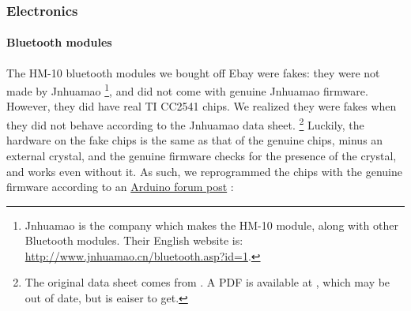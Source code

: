\documentclass[]{article}
\let\oldparagraph\paragraph
\renewcommand{\paragraph}[1]{\oldparagraph{#1}\mbox{}}
\begin{document}
\hypertarget{electronics}{%
\subsubsection{Electronics}\label{electronics}}

\hypertarget{bluetooth-modules}{%
\paragraph{Bluetooth modules}\label{bluetooth-modules}}

The HM-10 bluetooth modules we bought off Ebay were fakes: they were not
made by Jnhuamao \footnote{Jnhuamao is the company which makes the HM-10
  module, along with other Bluetooth modules. Their English website is:
  \url{http://www.jnhuamao.cn/bluetooth.asp?id=1}.}, and did not come
with genuine Jnhuamao firmware. However, they did have real TI CC2541
chips. We realized they were fakes when they did not behave according to
the Jnhuamao data sheet. \footnote{The original data sheet comes from \cite{jnhuamaodatasheet}. A PDF is available at \cite{jnhuamaomit}, which may be out of date, but is eaiser to get.}
Luckily, the hardware on the fake chips is the same as
that of the genuine chips, minus an external crystal, and the genuine
firmware checks for the presence of the crystal, and works even without
it. \cite{crystal}
As such, we reprogrammed the chips with the genuine firmware according
to an
\href{http://forum.arduino.cc/index.php?topic=393655.msg2709528\#msg2709528}{Arduino
forum post}  \cite{crystal}:
\end{document}
